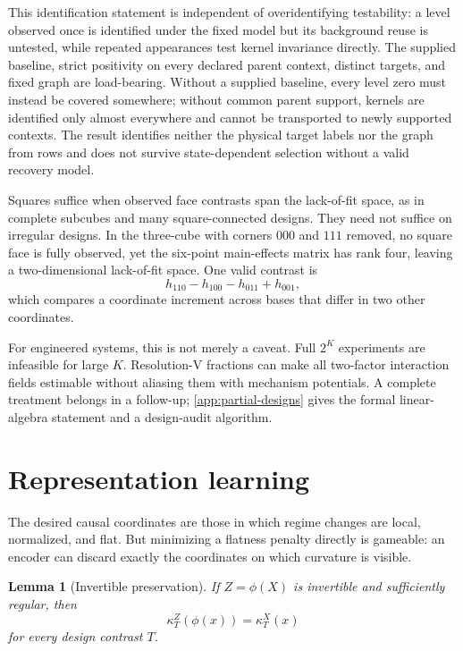 \documentclass[11pt]{article}
\newtheorem{lemma}[theorem]{Lemma}
\begin{document}
This identification statement is independent of overidentifying testability: a
level observed once is identified under the fixed model but its background
reuse is untested, while repeated appearances test kernel invariance directly.
The supplied baseline, strict positivity on every declared parent context,
distinct targets, and fixed graph are load-bearing.  Without a supplied
baseline, every level zero must instead be covered somewhere; without common
parent support, kernels are identified only almost everywhere and cannot be
transported to newly supported contexts.  The result identifies neither the
physical target labels nor the graph from rows and does not survive
state-dependent selection without a valid recovery model.

Squares suffice when observed face contrasts span the lack-of-fit space, as in complete subcubes and many square-connected designs.  They need not suffice on irregular designs.  In the three-cube with corners \(000\) and \(111\) removed, no square face is fully observed, yet the six-point main-effects matrix has rank four, leaving a two-dimensional lack-of-fit space.  One valid contrast is
\begin{equation}
h_{110}-h_{100}-h_{011}+h_{001},
\end{equation}
which compares a coordinate increment across bases that differ in two other coordinates.

For engineered systems, this is not merely a caveat.  Full \(2^K\) experiments are infeasible for large \(K\).  Resolution-V fractions can make all two-factor interaction fields estimable without aliasing them with mechanism potentials.  A complete treatment belongs in a follow-up; \cref{app:partial-designs} gives the formal linear-algebra statement and a design-audit algorithm.

\section{Representation learning}

The desired causal coordinates are those in which regime changes are local, normalized, and flat.  But minimizing a flatness penalty directly is gameable: an encoder can discard exactly the coordinates on which curvature is visible.

\begin{lemma}[Invertible preservation]
\label{lem:invertible-preservation}
If \(Z=\phi(X)\) is invertible and sufficiently regular, then
\begin{equation}
\kappa_T^Z(\phi(x))=\kappa_T^X(x)
\end{equation}
for every design contrast \(T\).
\end{lemma}
\end{document}
